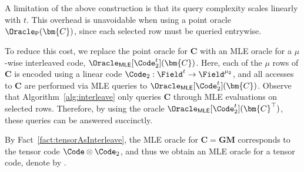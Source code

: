 \section{\methodname}
\label{sec:switch}

\subsection{\tensorswitchplus}
\label{sec:tensorswitch}
A limitation of the above \blazeplus construction is that its query complexity
scales linearly with $t$.
This overhead is unavoidable when using a point oracle
$\Oracle_{\mathsf{P}}(\bm{C})$, since each selected row must be queried entrywise.

To reduce this cost, we replace the point oracle for $\bm{C}$ with an
MLE oracle for a $\mu$-wise interleaved code,
$\Oracle_{\mathsf{MLE}}[\Code_2^{t}](\bm{C})$.
Here, each of the $\mu$ rows of $\bm{C}$ is encoded using a linear code
$\Code_2:\Field^{t}\to\Field^{\mu_2}$,
and all accesses to $\bm{C}$ are performed via MLE queries to
$\Oracle_{\mathsf{MLE}}[\Code_2^{t}](\bm{C})$.
Observe that Algorithm~\ref{alg:interleave} only queries $\bm{C}$ through MLE
evaluations on selected rows.
Therefore, by using the oracle
$\Oracle_{\mathsf{MLE}}[\Code_2^{t}](\bm{C}^\top)$,
these queries can be answered succinctly.

By Fact~\ref{fact:tensorAsInterleave},
the MLE oracle for $\bm{C}=\bm{G}\bm{M}$ corresponds to the tensor code
$\Code \otimes \Code_2$,
and thus we obtain an MLE oracle for a tensor code, denote by
\tensorswitchplus.

